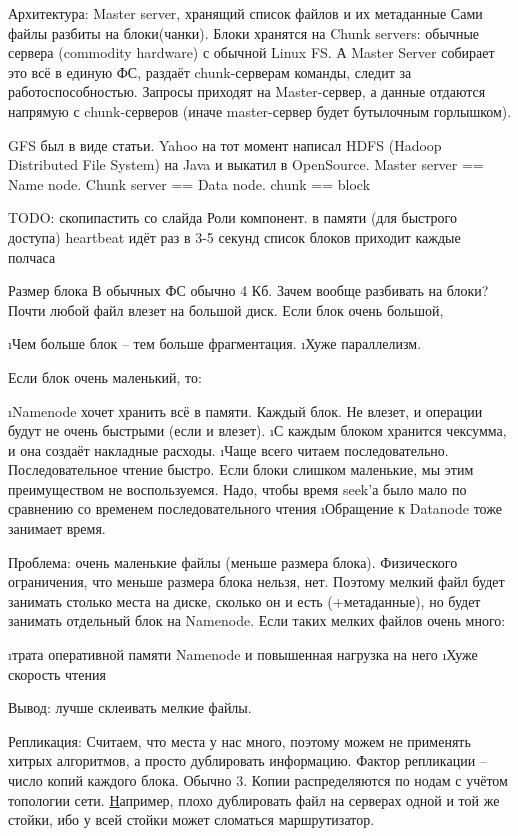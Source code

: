 	Архитектура:
Master server, хранящий список файлов и их метаданные
Сами файлы разбиты на блоки(чанки).
Блоки хранятся на Chunk servers: обычные сервера (commodity hardware) с обычной Linux FS. А Master Server собирает это всё в единую ФС, раздаёт chunk-серверам команды, следит за работоспособностью. Запросы приходят на Master-сервер, а данные отдаются напрямую с chunk-серверов (иначе master-сервер будет бутылочным горлышком).

GFS был в виде статьи. Yahoo на тот момент написал HDFS (Hadoop Distributed File System) на Java и выкатил в OpenSource.
Master server == Name node. Chunk server == Data node. chunk == block

TODO: скопипастить со слайда Роли компонент.
в памяти (для быстрого доступа)
heartbeat идёт раз в 3-5 секунд
список блоков приходит каждые полчаса

Размер блока
В обычных ФС обычно 4 Кб. 
Зачем вообще разбивать на блоки? Почти любой файл влезет на большой диск. 
Если блок очень большой,
\begin{enumerate}
	\i Чем больше блок -- тем больше фрагментация.
	\i Хуже параллелизм.
\end{enumerate}
Если блок очень маленький, то: 
\begin{enumerate}
	\i Namenode хочет хранить всё в памяти. Каждый блок. Не влезет, и операции будут не очень быстрыми (если и влезет). 
	\i С каждым блоком хранится чексумма, и она создаёт накладные расходы. 
	\i Чаще всего читаем последовательно. Последовательное чтение быстро. Если блоки слишком маленькие, мы этим преимуществом не воспользуемся. Надо, чтобы время seek'а было мало по сравнению со временем последовательного чтения
	\i Обращение к Datanode тоже занимает время. 
\end{enumerate}

Проблема: очень маленькие файлы (меньше размера блока).
Физического ограничения, что меньше размера блока нельзя, нет. Поэтому мелкий файл будет занимать столько места на диске, сколько он и есть (+метаданные), но будет занимать отдельный блок на Namenode. Если таких мелких файлов очень много:
\begin{enumerate}
	\i трата оперативной памяти Namenode и повышенная нагрузка на него
	\i Хуже скорость чтения
\end{enumerate}
Вывод: лучше склеивать мелкие файлы.

Репликация:
Считаем, что места у нас много, поэтому можем не применять хитрых алгоритмов, а просто дублировать информацию.
Фактор репликации -- число копий каждого блока. Обычно 3. Копии распределяются по нодам с учётом топологии сети.
 \href{https://youtu.be/-hE8jkyfqMw?t=2m55s}
 Например, плохо дублировать файл на серверах одной и той же стойки, ибо у всей стойки может сломаться маршрутизатор. 
 
